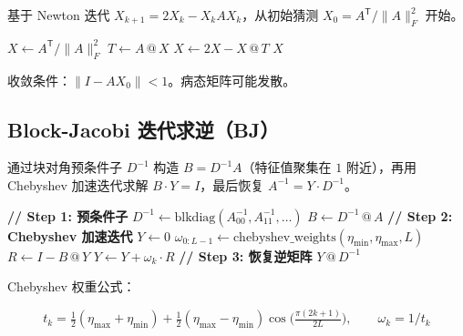 \documentclass[11pt,a4paper]{ctexart}
\begin{document}
基于 Newton 迭代 $X_{k+1} = 2X_k - X_k A X_k$，从初始猜测 $X_0 = A^{\mathsf T}/\|A\|_F^2$ 开始。

\begin{algorithm}[H]
\caption{Newton-Schulz 迭代求逆}
\begin{algorithmic}[1]
\State $X \gets A^{\mathsf T} / \|A\|_F^2$ 
 
    \State $T \gets A \mathbin{@} X$ 
    \State $X \gets 2X - X \mathbin{@} T$ 
\EndFor
\State \Return $X$
\end{algorithmic}
\end{algorithm}

\noindent 收敛条件：$\|I - AX_0\| < 1$。病态矩阵可能发散。

\subsection{Block-Jacobi 迭代求逆（BJ）}

通过块对角预条件子 $D^{-1}$ 构造 $B = D^{-1}A$（特征值聚集在 $1$ 附近），再用 Chebyshev 加速迭代求解 $B\cdot Y = I$，最后恢复 $A^{-1} = Y \cdot D^{-1}$。

\begin{algorithm}[H]
\caption{Block-Jacobi 迭代求逆}
\begin{algorithmic}[1]
\State \textbf{// Step 1: 预条件子}
\State $D^{-1} \gets \text{blkdiag}(A_{00}^{-1}, A_{11}^{-1}, \ldots)$
\State $B \gets D^{-1} \mathbin{@} A$ 
\State \textbf{// Step 2: Chebyshev 加速迭代}
\State $Y \gets 0$
\State $\omega_{0:L-1} \gets \text{chebyshev\_weights}(\eta_{\min}, \eta_{\max}, L)$
 
    \State $R \gets I - B \mathbin{@} Y$ 
    \State $Y \gets Y + \omega_k \cdot R$ 
\EndFor
\State \textbf{// Step 3: 恢复逆矩阵}
\State \Return $Y \mathbin{@} D^{-1}$ 
\end{algorithmic}
\end{algorithm}

\noindent Chebyshev 权重公式：

\begin{equation}
t_k = \tfrac{1}{2}(\eta_{\max}+\eta_{\min}) + \tfrac{1}{2}(\eta_{\max}-\eta_{\min})
      \cos\!\Big(\tfrac{\pi(2k+1)}{2L}\Big),\qquad
\omega_k = 1/t_k
\end{equation}
\end{document}

